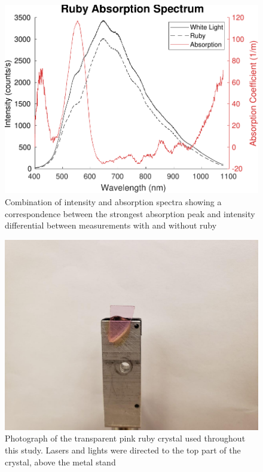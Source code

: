 \documentclass[11pt, a4paper, twocolumn]{article}
\begin{document}
\begin{figure}[H]
\includegraphics[width=\linewidth]{absorptionAndIntensitySpectra.pdf}
\caption{ Combination of intensity and absorption spectra showing a correspondence between the strongest absorption peak and intensity differential between measurements with and without ruby
}
\label{fig:intensities}
\end{figure}

\begin{figure}[H]
\includegraphics[width=\linewidth]{rubyPhoto.png}
\caption{Photograph of the transparent pink ruby crystal used throughout this study. Lasers and lights were directed to the top part of the crystal, above the metal stand
}
\label{fig:intensities}
\end{figure}
\end{document}
